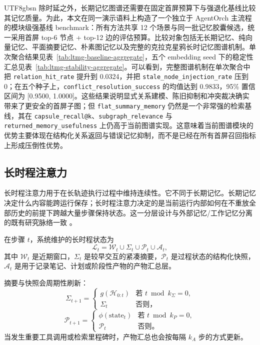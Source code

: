 \documentclass[a4paper,fleqn]{cas-sc}
\begin{document}
\begin{CJK*}{UTF8}{gbsn}
除时延之外，长期记忆图谱还需要在固定首屏预算下与强退化基线比较其记忆质量。为此，本文在同一演示语料上构造了一个独立于 AgentOrch 主流程的模块级强基线 benchmark：所有方法共享 12 个场景与同一批记忆胶囊候选，统一采用首屏 top-6 节点 + top-12 边的评估预算。比较对象包括无长期记忆、纯向量记忆、平面摘要记忆、朴素图记忆以及完整的克拉克星鸦长时记忆图谱机制。单次聚合结果见表~\ref{tab:ltmg-baseline-aggregate}，五个 embedding seed 下的稳定性汇总见表~\ref{tab:ltmg-stability-aggregate}。可以看到，完整图谱机制在单次聚合中把 \texttt{relation\_hit\_rate} 提升到 0.0324，并把 \texttt{stale\_node\_injection\_rate} 压到 0；在五个种子上，\texttt{conflict\_resolution\_success} 的均值达到 0.9833，95\% 置信区间为 [0.9500, 1.0000]。这些结果说明显式关系建模、陈旧抑制和冲突裁决确实带来了更安全的首屏子图；但 \texttt{flat\_summary\_memory} 仍然是一个非常强的检索基线，其在 \texttt{capsule\_recall@k}、\texttt{subgraph\_relevance} 与 \texttt{returned\_memory\_usefulness} 上仍高于当前图谱实现。这意味着当前图谱模块的优势主要体现在结构化关系返回与错误记忆抑制，而不是已经在所有首屏召回指标上形成压倒性优势。

\subsection{长时程注意力}

长时程注意力用于在长轨迹执行过程中维持连续性。它不同于长期记忆。长期记忆决定什么内容能跨运行保存；长时程注意力决定的是当前运行内部如何在不重放全部历史的前提下跨越大量步骤保持状态。这一分层设计与外部记忆/工作记忆分离的既有研究脉络一致 \citep{packer2023memgpt,park2023generative,zhong2023memorybank}。

在步骤 $t$，系统维护的长时程状态为
\begin{equation}
\mathcal{L}_t = \mathcal{W}_t \cup \Sigma_t \cup \mathcal{P}_t \cup \mathcal{A}_t,
\end{equation}
其中 $\mathcal{W}_t$ 是近期窗口，$\Sigma_t$ 是较早交互的紧凑摘要，$\mathcal{P}_t$ 是过程状态的结构化快照，$\mathcal{A}_t$ 是用于记录笔记、计划或阶段性产物的产物汇总层。

摘要与快照会周期性刷新：
\begin{equation}
\Sigma_{t+1} =
\begin{cases}
g(\mathcal{H}_{0:t}) & \text{若 } t \bmod k_{\Sigma} = 0, \\
\Sigma_t & \text{否则，}
\end{cases}
\end{equation}
\begin{equation}
\mathcal{P}_{t+1} =
\begin{cases}
\phi(\text{state}_t) & \text{若 } t \bmod k_{P} = 0, \\
\mathcal{P}_t & \text{否则。}
\end{cases}
\end{equation}
当发生重要工具调用或检索里程碑时，产物汇总也会按每隔 $k_A$ 步的方式更新。


\end{CJK*}
\end{document}
